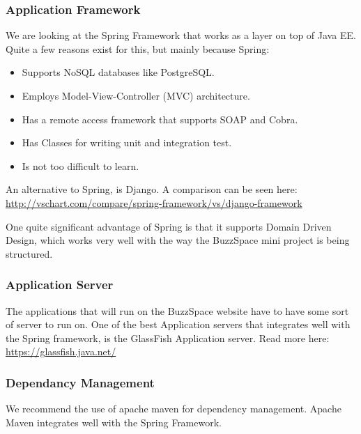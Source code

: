 \subsubsection{Application Framework}

We are looking at the Spring Framework that works as a layer on top of Java EE. Quite a few reasons exist for this, but mainly because Spring:

\begin{itemize}
\item	Supports NoSQL databases like PostgreSQL.
\item	Employs Model-View-Controller (MVC) architecture. 
\item	Has a remote access framework that supports SOAP and Cobra. 
\item	Has Classes for writing unit and integration test. 
\item	Is not too difficult to learn. 
\end{itemize}

An alternative to Spring, is Django. A comparison can be seen here: \url{http://vschart.com/compare/spring-framework/vs/django-framework}

One quite significant advantage of Spring is that it supports Domain Driven Design, which works very well with the way the BuzzSpace mini project is being structured. 

\subsubsection{Application Server}

The applications that will run on the BuzzSpace website have to have some sort of server to run on. One of the best Application servers that integrates well with the Spring framework, is the GlassFish Application server. Read more here: \url{https://glassfish.java.net/}

\subsubsection{Dependancy Management}

We recommend the use of apache maven for dependency management. Apache Maven integrates well with the Spring Framework. 

